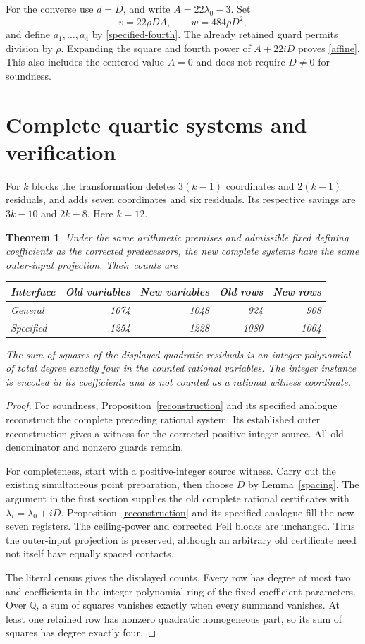 \documentclass[11pt]{article}
\newtheorem{theorem}{Theorem}
\newcommand{\Q}{\mathbb Q}
\begin{document}
For the converse use $d=D$, and write $A=22\lambda_0-3$. Set
\[
 v=22\rho DA,\qquad w=484\rho D^2,
\]
and define $a_1,\ldots,a_4$ by \eqref{specified-fourth}. The already
retained guard permits division by $\rho$. Expanding the square and
fourth power of $A+22iD$ proves \eqref{affine}. This also includes
the centered value $A=0$ and does not require $D\ne0$ for soundness.

\section{Complete quartic systems and verification}

For $k$ blocks the transformation deletes $3(k-1)$ coordinates and
$2(k-1)$ residuals, and adds seven coordinates and six residuals.
Its respective savings are $3k-10$ and $2k-8$. Here $k=12$.

\begin{theorem}\label{main}
Under the same arithmetic premises and admissible fixed defining
coefficients as the corrected predecessors, the new complete systems
have the same outer-input projection. Their counts are
\begin{center}
\begin{tabular}{lrrrr}
\toprule
Interface & Old variables & New variables & Old rows & New rows\\
\midrule
General &1074&1048&924&908\\
Specified &1254&1228&1080&1064\\
\bottomrule
\end{tabular}
\end{center}
The sum of squares of the displayed quadratic residuals is an integer
polynomial of total degree exactly four in the counted rational
variables. The integer instance is encoded in its coefficients and is
not counted as a rational witness coordinate.
\end{theorem}
\begin{proof}
For soundness, Proposition~\ref{reconstruction} and its specified
analogue reconstruct the complete preceding rational system. Its
established outer reconstruction gives a witness for the corrected
positive-integer source. All old denominator and nonzero guards remain.

For completeness, start with a positive-integer source witness. Carry
out the existing simultaneous point preparation, then choose $D$ by
Lemma~\ref{spacing}. The argument in the first section supplies the old
complete rational certificates with $\lambda_i=\lambda_0+iD$.
Proposition~\ref{reconstruction} and its specified analogue fill the
new seven registers. The ceiling-power and corrected Pell blocks are
unchanged. Thus the outer-input projection is preserved, although an
arbitrary old certificate need not itself have equally spaced contacts.

The literal census gives the displayed counts. Every row has degree at
most two and coefficients in the integer polynomial ring of the fixed
coefficient parameters. Over $\Q$, a sum of squares vanishes exactly
when every summand vanishes. At least one retained row has nonzero
quadratic homogeneous part, so its sum of squares has degree exactly
four.
\end{proof}
\end{document}
